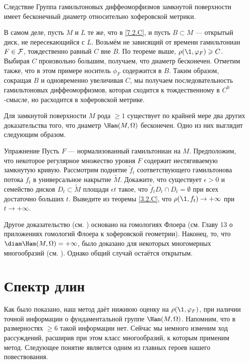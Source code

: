 \begin{thm}{Следствие}\label{7.2.D} Группа гамильтоновых диффеоморфизмов замкнутой поверхности имеет бесконечный диаметр относительно хоферовской метрики.
\end{thm}

В самом деле, пусть $M$ и $L$ те же, что в \ref{7.2.C}, и пусть $B \subset M$ — открытый диск, не пересекающийся с $L$.
Возьмём не зависящий от времени гамильтониан $F \in \mathcal{F}$, тождественно равный $C$ вне $B$.
По теореме выше, $\rho (\1, \phi_F) \ge C$.
Выбирая $C$ произвольно большим, получаем, что диаметр бесконечен.
Отметим также, что в этом примере носитель $\phi_F$ содержится в $B$.
Таким образом, сокращая $B$ и одновременно увеличивая $C$, мы получаем
последовательность гамильтоновых диффеоморфизмов, которая сходится к
тождественному в $C^0$-смысле, но расходится в хоферовской метрике. 

Для замкнутой поверхности $M$ рода $\ge 1$ существует по крайней мере
два других доказательства того, что диаметр $\Ham (M, \Omega)$
бесконечен. 
Одно из них выглядит следующим образом. 

\begin{ex}[см. \cite{LM2}.]{Упражнение} \label{7.2.E}
Пусть $F$ — нормализованный гамильтониан на $M$.
Предположим, что некоторое регулярное множество уровня $F$ содержит нестягиваемую замкнутую кривую. 
Рассмотрим поднятие $\tilde f_t$ соответствующего гамильтонова потока $f_t$ в универсальное накрытие $\tilde M$. 
Докажите, что существует $\epsilon> 0$ и семейство дисков $D_t \subset \tilde M$ площади $\epsilon t$ такое, что $\tilde f_t D_t \cap D_t = \emptyset$ при всех достаточно больших $t$. 
Выведите из теоремы \ref{3.2.C}, что $\rho (\1, f_t) \to + \infty$ при $t \to + \infty$. 
\end{ex}

Другое доказательство (см. \cite{Sch3}) основано на гомологиях Флоера (см. Главу 13 о приложениях гомологий Флоера к хоферовской геометрии).
Наконец, то, что $\diam \Ham (M, \Omega) = + \infty$, было доказано для некоторых многомерных многообразий (см. \cite{LM2,Sch3,P5}).
Однако общий случай остаётся открытым.

\section{Спектр длин}\label{sec:7.3}

Как было показано, наш метод даёт нижнюю оценку на $\rho (\1, \phi_F)$, при наличии точной информации о фундаментальной группе $\Ham (M, \Omega)$.
Напомним, что в размерностях $\ge 6$ такой информации нет.
Сейчас мы немного изменим ход рассуждений, расширив при этом класс многообразий, к которым применим метод.
Следующее понятие является одним из главных героев нашего повествования.

